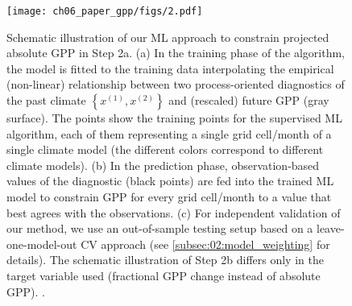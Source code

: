 \begin{figure}[p]
  \centering
  \texttt{[image: ch06\_paper\_gpp/figs/2.pdf]}
  \caption[
    Schematic illustration of our \acl{ML} approach to constrain projected
    absolute \acf{GPP} at the end of the  century in Step 2a.
  ]{
    Schematic illustration of our \acf{ML} approach to constrain projected
    absolute \acf{GPP} in Step 2a. (a) In the training phase of the algorithm,
    the model is fitted to the training data interpolating the empirical
    (non-linear) relationship between two process-oriented diagnostics of the
    past climate $\left\{ x^{(1)}, x^{(2)} \right\}$ and (rescaled) future
    \acs{GPP} (gray surface). The points show the training points for the
    supervised \acs{ML} algorithm, each of them representing a single grid
    cell/month of a single climate model (the different colors correspond to
    different climate models). (b) In the prediction phase, observation-based
    values of the diagnostic (black points) are fed into the trained \acs{ML}
    model to constrain \acs{GPP} for every grid cell/month to a value that best
    agrees with the observations. (c) For independent validation of our method,
    we use an out-of-sample testing setup based on a leave-one-model-out
    \acl{CV} approach (see \cref{subsec:02:model_weighting} for details). The
    schematic illustration of Step 2b differs only in the target variable used
    (fractional \acs{GPP} change instead of absolute \acs{GPP}).
    .
  }
  \label{fig:06:mlr_concept}
\end{figure}

